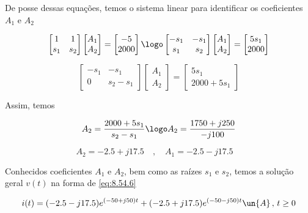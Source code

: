De posse dessas equações, temos o sistema linear para identificar os coeficientes $A_1$ e $A_2$

\begingroup
\renewcommand*{\arraystretch}{1.5}

\[
    \begin{bmatrix}
        1 & 1    \\
        s_1    & s_2
    \end{bmatrix}
    \begin{bmatrix}
        A_1 \\
        A_2
    \end{bmatrix}
    =
    \begin{bmatrix}
        -5 \\
        2000
    \end{bmatrix} \logo
    \begin{bmatrix}
        -s_1 & -s_1    \\
        s_1    & s_2
    \end{bmatrix}
    \begin{bmatrix}
        A_1 \\
        A_2
    \end{bmatrix}
    =
    \begin{bmatrix}
        5s_1 \\
        2000
    \end{bmatrix}
\]

\[
    \begin{bmatrix}
        -s_1 & -s_1    \\
        0    & s_2 - s_1
    \end{bmatrix}
    \begin{bmatrix}
        A_1 \\
        A_2
    \end{bmatrix}
    =
    \begin{bmatrix}
        5s_1 \\
        2000 + 5s_1
    \end{bmatrix}
\]

\endgroup

Assim, temos  

\[ A_2 = \frac{2000 + 5s_1}{s_2 - s_1} \logo  A_2 = \frac{1750 + j250}{-j100} \] 

\[ A_2 = -2.5 + j17.5 \quad , \quad A_1 = -2.5 - j17.5 \quad  \] 

Conhecidos coeficientes $A_1$ e $A_2$, bem como as raízes $s_1$ e $s_2$, temos a solução geral $v(t)$ na forma de \eqref{eq:8.54.6}

\[ i(t) = (-2.5 - j17.5)e^{(-50 + j50)t} + (-2.5 + j17.5)e^{(-50 - j50)t} \un{A} \, , \, t \geq 0  \]

